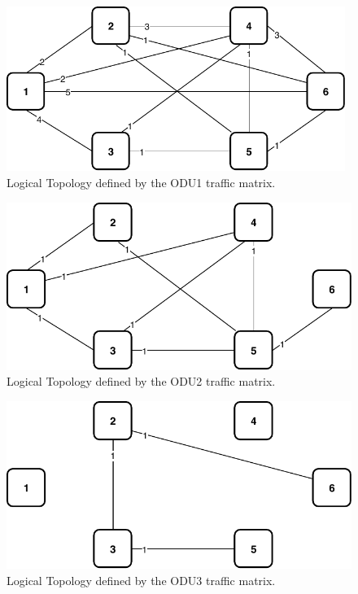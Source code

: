 \begin{figure}[h!]
\centering
\includegraphics[width=11cm]{sdf/ilp/opaque_protection/figures/logical_topology_ODU1_low}
\caption{Logical Topology defined by the ODU1 traffic matrix.}
\label{logical_ODU1_protectionlow}
\end{figure}
\newpage
\begin{figure}[h!]
\centering
\includegraphics[width=12cm]{sdf/ilp/opaque_protection/figures/logical_topology_ODU2_low}
\caption{Logical Topology defined by the ODU2 traffic matrix.}
\label{logical_ODU2_protectionlow}
\end{figure}

\begin{figure}[h!]
\centering
\includegraphics[width=12cm]{sdf/ilp/opaque_protection/figures/logical_topology_ODU3_low}
\caption{Logical Topology defined by the ODU3 traffic matrix.}
\label{logical_ODU3_protectionlow}
\end{figure}


